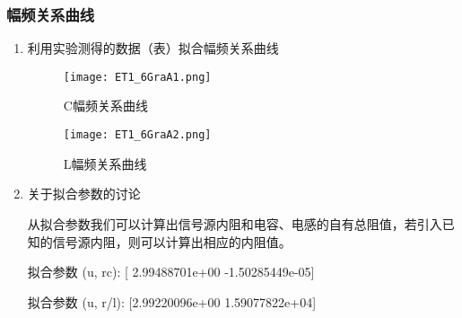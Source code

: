 \documentclass[dvipsnames, svgnames,a4paper,11pt]{article}
\begin{document}
	\subsubsection{幅频关系曲线}
	\begin{enumerate}
		\item 利用实验测得的数据（表）拟合幅频关系曲线
		
		\begin{figure}[htbp]
			\centering
			\texttt{[image: ET1\_6GraA1.png]}
			\caption{C幅频关系曲线}
			\label{fig:figA1}
		\end{figure}
		
		\begin{figure}[htbp]
			\centering
			\texttt{[image: ET1\_6GraA2.png]}
			\caption{L幅频关系曲线}
			\label{fig:figA2}
		\end{figure}
		
		\item 关于拟合参数的讨论
		
		从拟合参数我们可以计算出信号源内阻和电容、电感的自有总阻值，若引入已知的信号源内阻，则可以计算出相应的内阻值。
		
		拟合参数 (u, rc): [ 2.99488701e+00 -1.50285449e-05]	
		
		拟合参数 (u, r/l): [2.99220096e+00 1.59077822e+04]					
			
	\end{enumerate}
	
\end{document}
